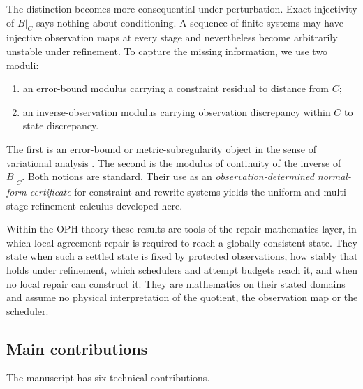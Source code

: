 \documentclass[11pt]{article}
\theoremstyle{definition}
\theoremstyle{remark}
\numberwithin{equation}{section}
\begin{document}
The distinction becomes more consequential under perturbation.  Exact injectivity of $B|_C$ says nothing about conditioning.  A sequence of finite systems may have injective observation maps at every stage and nevertheless become arbitrarily unstable under refinement.  To capture the missing information, we use two moduli:
\begin{enumerate}[label=(\roman*)]
\item an error-bound modulus carrying a constraint residual to distance from $C$;
\item an inverse-observation modulus carrying observation discrepancy within $C$ to state discrepancy.
\end{enumerate}
The first is an error-bound or metric-subregularity object in the sense of
variational analysis
\citep{Hoffman1952,Kruger2015,CibulkaDontchevKruger2018,DontchevRockafellar2014}.
The second is the modulus of continuity of the inverse of $B|_C$.  Both notions
are standard.  Their use as an \emph{observation-determined normal-form
certificate} for constraint and rewrite systems yields the uniform and
multi-stage refinement calculus developed here.

Within the OPH theory these results are tools of the repair-mathematics
layer, in which local agreement repair is required to reach a globally
consistent state. They state when such a settled state is fixed by protected
observations, how stably that holds under refinement, which schedulers and
attempt budgets reach it, and when no local repair can construct it. They
are mathematics on their stated domains and assume no physical
interpretation of the quotient, the observation map or the scheduler.

\subsection{Main contributions}

The manuscript has six technical contributions.
\end{document}
